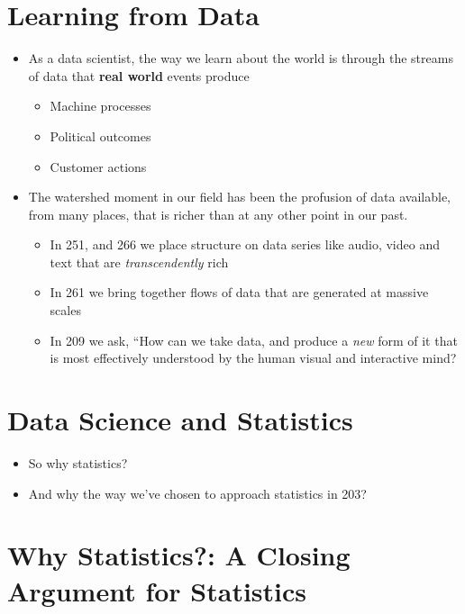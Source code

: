 \documentclass[
]{book}
\providecommand{\tightlist}{%
  \setlength{\itemsep}{0pt}\setlength{\parskip}{0pt}}
\theoremstyle{definition}
\theoremstyle{definition}
\theoremstyle{definition}
\theoremstyle{definition}
\theoremstyle{remark}
\begin{document}
\section{Learning from Data}\label{learning-from-data}

\begin{itemize}
\tightlist
\item
  As a data scientist, the way we learn about the world is through the streams of data that \textbf{real world} events produce

  \begin{itemize}
  \tightlist
  \item
    Machine processes
  \item
    Political outcomes
  \item
    Customer actions
  \end{itemize}
\item
  The watershed moment in our field has been the profusion of data available, from many places, that is richer than at any other point in our past.

  \begin{itemize}
  \tightlist
  \item
    In 251, and 266 we place structure on data series like audio, video and text that are \emph{transcendently} rich
  \item
    In 261 we bring together flows of data that are generated at massive scales
  \item
    In 209 we ask, ``How can we take data, and produce a \emph{new} form of it that is most effectively understood by the human visual and interactive mind?
  \end{itemize}
\end{itemize}

\section{Data Science and Statistics}\label{data-science-and-statistics}

\begin{itemize}
\tightlist
\item
  So why statistics?
\item
  And why the way we've chosen to approach statistics in 203?
\end{itemize}

\section{Why Statistics?: A Closing Argument for Statistics}\label{why-statistics-a-closing-argument-for-statistics}
\end{document}
